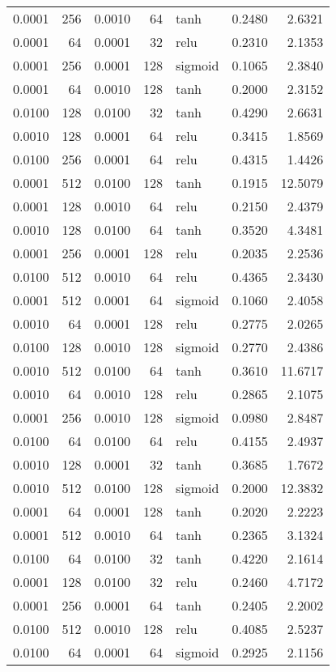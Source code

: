\begin{table}
\begin{tabular}{rrrrlrr}
0.0001 & 256 & 0.0010 & 64 & tanh & 0.2480 & 2.6321 \\
0.0001 & 64 & 0.0001 & 32 & relu & 0.2310 & 2.1353 \\
0.0001 & 256 & 0.0001 & 128 & sigmoid & 0.1065 & 2.3840 \\
0.0001 & 64 & 0.0010 & 128 & tanh & 0.2000 & 2.3152 \\
0.0100 & 128 & 0.0100 & 32 & tanh & 0.4290 & 2.6631 \\
0.0010 & 128 & 0.0001 & 64 & relu & 0.3415 & 1.8569 \\
0.0100 & 256 & 0.0001 & 64 & relu & 0.4315 & 1.4426 \\
0.0001 & 512 & 0.0100 & 128 & tanh & 0.1915 & 12.5079 \\
0.0001 & 128 & 0.0010 & 64 & relu & 0.2150 & 2.4379 \\
0.0010 & 128 & 0.0100 & 64 & tanh & 0.3520 & 4.3481 \\
0.0001 & 256 & 0.0001 & 128 & relu & 0.2035 & 2.2536 \\
0.0100 & 512 & 0.0010 & 64 & relu & 0.4365 & 2.3430 \\
0.0001 & 512 & 0.0001 & 64 & sigmoid & 0.1060 & 2.4058 \\
0.0010 & 64 & 0.0001 & 128 & relu & 0.2775 & 2.0265 \\
0.0100 & 128 & 0.0010 & 128 & sigmoid & 0.2770 & 2.4386 \\
0.0010 & 512 & 0.0100 & 64 & tanh & 0.3610 & 11.6717 \\
0.0010 & 64 & 0.0010 & 128 & relu & 0.2865 & 2.1075 \\
0.0001 & 256 & 0.0010 & 128 & sigmoid & 0.0980 & 2.8487 \\
0.0100 & 64 & 0.0100 & 64 & relu & 0.4155 & 2.4937 \\
0.0010 & 128 & 0.0001 & 32 & tanh & 0.3685 & 1.7672 \\
0.0010 & 512 & 0.0100 & 128 & sigmoid & 0.2000 & 12.3832 \\
0.0001 & 64 & 0.0001 & 128 & tanh & 0.2020 & 2.2223 \\
0.0001 & 512 & 0.0010 & 64 & tanh & 0.2365 & 3.1324 \\
0.0100 & 64 & 0.0100 & 32 & tanh & 0.4220 & 2.1614 \\
0.0001 & 128 & 0.0100 & 32 & relu & 0.2460 & 4.7172 \\
0.0001 & 256 & 0.0001 & 64 & tanh & 0.2405 & 2.2002 \\
0.0100 & 512 & 0.0010 & 128 & relu & 0.4085 & 2.5237 \\
0.0100 & 64 & 0.0001 & 64 & sigmoid & 0.2925 & 2.1156 \\

\end{tabular}
\end{table}
